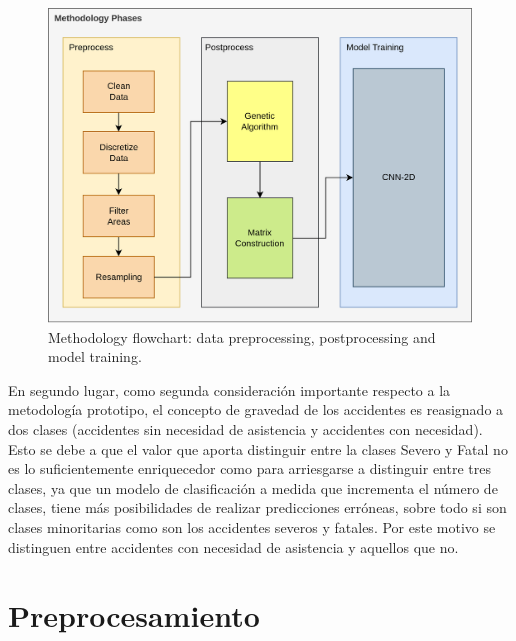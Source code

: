\documentclass{uathesis-es}
\begin{document}
\begin{figure}[H]
    \centering
    \includegraphics[width=14cm]{Figures/7th DataFlow Chart.png}
    \caption{Methodology flowchart: data preprocessing, postprocessing and model training.}
    \label{DataFlow}
\end{figure}

En segundo lugar, como segunda consideración importante respecto a la metodología prototipo, el concepto de gravedad de los accidentes es reasignado a dos clases (accidentes sin necesidad de asistencia y accidentes con necesidad). Esto se debe a que el valor que aporta distinguir entre la clases Severo y Fatal no es lo suficientemente enriquecedor como para arriesgarse a distinguir entre tres clases, ya que un modelo de clasificación a medida que incrementa el número de clases, tiene más posibilidades de realizar predicciones erróneas, sobre todo si son clases minoritarias como son los accidentes severos y fatales. Por este motivo se distinguen entre accidentes con necesidad de asistencia y aquellos que no.

\section{Preprocesamiento}
\end{document}
